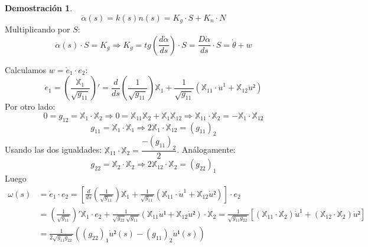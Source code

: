 \documentclass[twoside]{report}
\theoremstyle{definition}
\newtheorem*{dem}{Demostración}
\numberwithin{equation}{section}
\newcommand{\X}{\mathbb{X}}
\begin{document}
\begin{dem}
\[ \ddot{α}(s) = k(s)n(s) = K_g \cdot S + K_n \cdot N \]
Multiplicando por $S$:
\[ \ddot{α}(s) \cdot S = K_g \Rightarrow K_g = tg\left(\frac{d\dot{α}}{ds}\right) \cdot S = \frac{D\dot{α}}{ds} \cdot S = \dot{θ} + w \]
\end{dem}

Calculamos $w=\dot{e}_1 \cdot e_2$:
\[ \dot{e}_1 = \left(\frac{\X_1}{\sqrt{g_{11}}}\right)' = \frac{d}{ds} \left(\frac{1}{\sqrt{g_{11}}}\right) \X_1 + \frac{1}{\sqrt{g_{11}}} (\X_{11} \cdot \dot{u}^1 + \X_{12} \dot{u}²) \]
Por otro lado:
\[ 0 = g_{12} = \X_1 \cdot \X_2 \Rightarrow 0 = \X_{11} \X_2 + \X_1 \X_{12} \Rightarrow \X_{11} \cdot \X_2 = - \X_1 \cdot \X_{12} \]
\[ g_{11} = \X_1 \cdot \X_1 \Rightarrow 2 \X_1 \cdot \X_{12} = (g_{11})_2 \]
Usando las dos igualdades: $\X_{11}\cdot \X_2 = \dfrac{-(g_{11})_2}{2}$. Análogamente:
\[ g_{22} = \X_2 \cdot \X_2 \Rightarrow 2 \X_{12} \cdot \X_2 = (g_{22})_1 \]
Luego
\begin{align*} 
ω(s) & = \dot{e}_1 \cdot e_2 = \left[\frac{d}{ds} (\frac{1}{\sqrt{g_{11}}}) \X_1 + \frac{1}{\sqrt{g_{11}}} (\X_{11} \cdot \dot{u}^1 + \X_{12} \dot{u}²)\right] \cdot e_2 \\
	& = \left(\frac{1}{\sqrt{g_{11}}}\right)' \X_1 \cdot e_2 + \frac{1}{\sqrt{g_{22}}\sqrt{g_{11}}} (\X_{11} \dot{u}¹+ \X_{12} \dot{u}²) \cdot \X_2 = \frac{1}{\sqrt{g_{11} g_{22}}}
	\left[(\X_{11} \cdot \X_2)  \dot{u}^1 + (\X_{12} \cdot \X_2) \dot{u}²\right] \\
	& = \frac{1}{2 \sqrt{g_{11}g_{22}}} \left((g_{22})_1 \dot{u}²(s) - (g_{11})_2 \dot{u}¹(s) \right)
\end{align*}
\newpage
\end{document}
